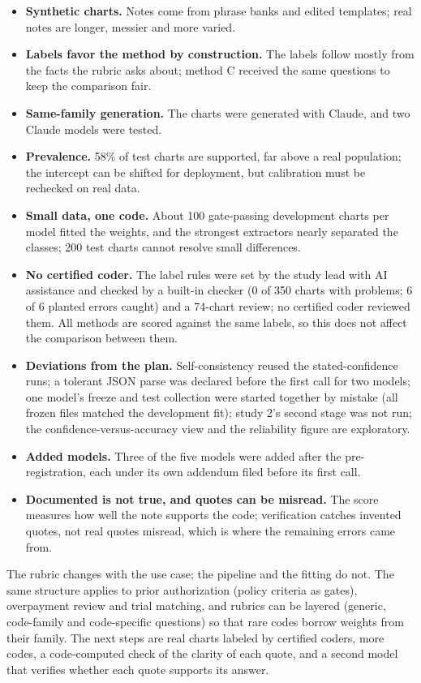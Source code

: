 \documentclass[10pt,letterpaper]{article}
\begin{document}
\begin{itemize}
  \item \textbf{Synthetic charts.} Notes come from phrase banks and edited templates; real notes are longer, messier and more varied.
  \item \textbf{Labels favor the method by construction.} The labels follow mostly from the facts the rubric asks about; method C received the same questions to keep the comparison fair.
  \item \textbf{Same-family generation.} The charts were generated with Claude, and two Claude models were tested.
  \item \textbf{Prevalence.} 58\% of test charts are supported, far above a real population; the intercept can be shifted for deployment, but calibration must be rechecked on real data.
  \item \textbf{Small data, one code.} About 100 gate-passing development charts per model fitted the weights, and the strongest extractors nearly separated the classes; 200 test charts cannot resolve small differences.
  \item \textbf{No certified coder.} The label rules were set by the study lead with AI assistance and checked by a built-in checker (0 of 350 charts with problems; 6 of 6 planted errors caught) and a 74-chart review; no certified coder reviewed them. All methods are scored against the same labels, so this does not affect the comparison between them.
  \item \textbf{Deviations from the plan.} Self-consistency reused the stated-confidence runs; a tolerant JSON parse was declared before the first call for two models; one model's freeze and test collection were started together by mistake (all frozen files matched the development fit); study 2's second stage was not run; the confidence-versus-accuracy view and the reliability figure are exploratory.
  \item \textbf{Added models.} Three of the five models were added after the pre-registration, each under its own addendum filed before its first call.
  \item \textbf{Documented is not true, and quotes can be misread.} The score measures how well the note supports the code; verification catches invented quotes, not real quotes misread, which is where the remaining errors came from.
\end{itemize}

The rubric changes with the use case; the pipeline and the fitting do not. The same structure applies to prior authorization (policy criteria as gates), overpayment review and trial matching, and rubrics can be layered (generic, code-family and code-specific questions) so that rare codes borrow weights from their family. The next steps are real charts labeled by certified coders, more codes, a code-computed check of the clarity of each quote, and a second model that verifies whether each quote supports its answer.
\end{document}
